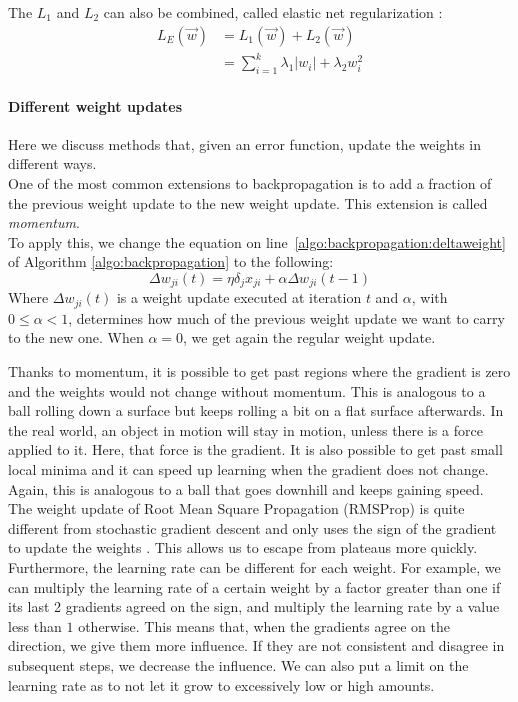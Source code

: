The $L_1$ and $L_2$ can also be combined, called elastic net regularization \citep{hastie2012ElasticNet}:
\begin{align}
    L_E (\overrightarrow{w}) &= L_1(\overrightarrow{w}) + L_2(\overrightarrow{w})\\
    &= \sum_{i=1}^k \lambda_1 \vert w_i \vert + \lambda_2 w_i^2
\end{align}


\paragraph{Different weight updates} %
\label{par:different_weight_updates}
Here we discuss methods that, given an error function, update the weights in different ways.\\

One of the most common extensions to backpropagation is to add a fraction of the previous weight update to the new weight update. This extension is called \textit{momentum}.\\
To apply this, we change the equation on line~\ref{algo:backpropagation:deltaweight} of Algorithm \ref{algo:backpropagation} to the following:
\begin{equation}
    \Delta w_{ji}(t) = \eta \delta_j x_{ji} + \alpha \Delta w_{ji}(t-1)
\end{equation}
Where $\Delta w_{ji}(t)$ is a weight update executed at iteration $t$ and $\alpha$, with $0 \le \alpha < 1$, determines how much of the previous weight update we want to carry to the new one. When $\alpha = 0$, we get again the regular weight update.

Thanks to momentum, it is possible to get past regions where the gradient is zero and the weights would not change without momentum.
This is analogous to a ball rolling down a surface but keeps rolling a bit on a flat surface afterwards. In the real world, an object in motion will stay in motion, unless there is a force applied to it.
Here, that force is the gradient. It is also possible to get past small local minima and it can speed up learning when the gradient does not change. Again, this is analogous to a ball that goes downhill and keeps gaining speed.\\

The weight update of Root Mean Square Propagation (RMSProp) is quite different from stochastic gradient descent and only uses the sign of the gradient to update the weights \citep{Tieleman2012LectureMagnitude.}.
This allows us to escape from plateaus more quickly. Furthermore, the learning rate can be different for each weight.
For example, we can multiply the learning rate of a certain weight by a factor greater than one if its last 2 gradients agreed on the sign, and multiply the learning rate by a value less than $1$ otherwise.
This means that, when the gradients agree on the direction, we give them more influence. If they are not consistent and disagree in subsequent steps, we decrease the influence. We can also put a limit on the learning rate as to not let it grow to excessively low or high amounts.

